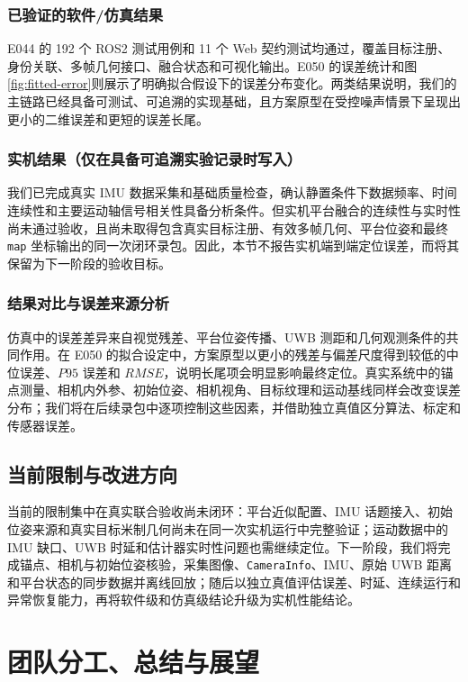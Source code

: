 \documentclass[UTF8,a4paper,12pt]{ctexart}
\begin{document}
\subsubsection{已验证的软件/仿真结果}
E044 的 192 个 ROS2 测试用例和 11 个 Web 契约测试均通过，覆盖目标注册、身份关联、多帧几何接口、融合状态和可视化输出。E050 的误差统计和图\ref{fig:fitted-error}则展示了明确拟合假设下的误差分布变化。两类结果说明，我们的主链路已经具备可测试、可追溯的实现基础，且方案原型在受控噪声情景下呈现出更小的二维误差和更短的误差长尾。

\subsubsection{实机结果（仅在具备可追溯实验记录时写入）}
我们已完成真实 IMU 数据采集和基础质量检查，确认静置条件下数据频率、时间连续性和主要运动轴信号相关性具备分析条件。但实机平台融合的连续性与实时性尚未通过验收，且尚未取得包含真实目标注册、有效多帧几何、平台位姿和最终 \texttt{map} 坐标输出的同一次闭环录包。因此，本节不报告实机端到端定位误差，而将其保留为下一阶段的验收目标。

\subsubsection{结果对比与误差来源分析}
仿真中的误差差异来自视觉残差、平台位姿传播、UWB 测距和几何观测条件的共同作用。在 E050 的拟合设定中，方案原型以更小的残差与偏差尺度得到较低的中位误差、$P95$ 误差和 $RMSE$，说明长尾项会明显影响最终定位。真实系统中的锚点测量、相机内外参、初始位姿、相机视角、目标纹理和运动基线同样会改变误差分布；我们将在后续录包中逐项控制这些因素，并借助独立真值区分算法、标定和传感器误差。

\subsection{当前限制与改进方向}
当前的限制集中在真实联合验收尚未闭环：平台近似配置、IMU 话题接入、初始位姿来源和真实目标米制几何尚未在同一次实机运行中完整验证；运动数据中的 IMU 缺口、UWB 时延和估计器实时性问题也需继续定位。下一阶段，我们将完成锚点、相机与初始位姿核验，采集图像、\texttt{CameraInfo}、IMU、原始 UWB 距离和平台状态的同步数据并离线回放；随后以独立真值评估误差、时延、连续运行和异常恢复能力，再将软件级和仿真级结论升级为实机性能结论。

\section{团队分工、总结与展望}\label{sec:team}
\end{document}
